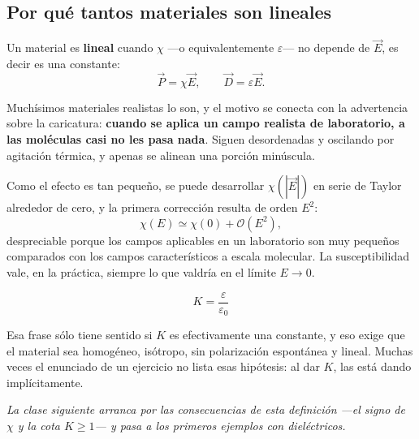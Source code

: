 \documentclass[12pt,a4paper]{article}
\begin{document}
\subsection{Por qué tantos materiales son lineales}

Un material es \textbf{lineal} cuando $\chi$ ---o equivalentemente
$\varepsilon$--- no depende de $\vec E$, es decir es una constante:
\[
\vec P = \chi \vec E, \qquad \vec D = \varepsilon \vec E .
\]

Muchísimos materiales realistas lo son, y el motivo se conecta con la advertencia
sobre la caricatura: \textbf{cuando se aplica un campo realista de laboratorio, a
las moléculas casi no les pasa nada}. Siguen desordenadas y oscilando por
agitación térmica, y apenas se alinean una porción minúscula.

Como el efecto es tan pequeño, se puede desarrollar $\chi(|\vec E|)$ en serie de
Taylor alrededor de cero, y la primera corrección resulta de orden $E^2$:
\[
\chi(E) \simeq \chi(0) + \mathcal{O}(E^2),
\]
despreciable porque los campos aplicables en un laboratorio son muy pequeños
comparados con los campos característicos a escala molecular. La susceptibilidad
vale, en la práctica, siempre lo que valdría en el límite $E \to 0$.

\begin{keybox}
\[
\boxed{\ K = \frac{\varepsilon}{\varepsilon_0}\ }
\]
\end{keybox}

\begin{warnbox}
Esa frase sólo tiene sentido si $K$ es efectivamente una constante, y eso exige
que el material sea homogéneo, isótropo, sin polarización espontánea y lineal.
Muchas veces el enunciado de un ejercicio no lista esas hipótesis: al dar $K$,
las está dando implícitamente.
\end{warnbox}

\vspace{1em}
\noindent\emph{La clase siguiente arranca por las consecuencias de esta
definición ---el signo de $\chi$ y la cota $K \ge 1$--- y pasa a los primeros
ejemplos con dieléctricos.}
\end{document}

